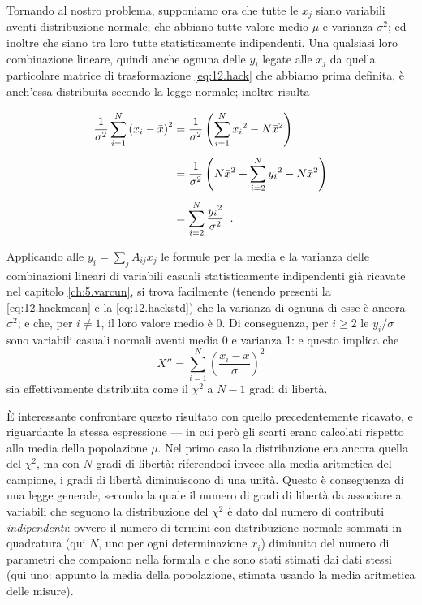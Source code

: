 Tornando al nostro problema, supponiamo ora che tutte le
$x_j$ siano variabili aventi distribuzione normale; che
abbiano tutte valore medio $\mu$ e varianza $\sigma^2$; ed
inoltre che siano tra loro tutte statisticamente
indipendenti.  Una qualsiasi loro combinazione lineare,
quindi anche ognuna delle $y_i$ legate alle $x_j$ da quella
particolare matrice di trasformazione \eqref{eq:12.hack} che
abbiamo prima definita, \`e anch'essa distribuita secondo la
legge normale; inoltre risulta

\begin{align*}
  \frac{1}{\sigma^2} \sum_{i=1}^N \left( x_i - \bar x
    \right)^2 &= \frac{1}{\sigma^2} \left(
    \sum_{i=1}^N {x_i}^2 - N {\bar x}^2 \right) \\[1ex]
  &= \frac{1}{\sigma^2} \left( N {\bar x}^2 +
    \sum_{i=2}^N {y_i}^2 - N {\bar x}^2  \right)
    \\[1ex]
  &= \sum_{i=2}^N \frac{{y_i}^2}{\sigma^2} \;\; .
\end{align*}

Applicando alle $y_i = \sum_j A_{ij} x_j$ le formule per la
media e la varianza delle combinazioni lineari di variabili
casuali statisticamente indipendenti gi\`a ricavate nel
capitolo \ref{ch:5.varcun}, si trova facilmente (tenendo
presenti la \eqref{eq:12.hackmean} e la
\eqref{eq:12.hackstd}) che la varianza di ognuna di esse \`e
ancora $\sigma^2$; e che, per $i \ne 1$, il loro valore
medio \`e 0.  Di conseguenza, per $i \geq 2$ le $y_i /
\sigma$ sono variabili casuali normali aventi media 0 e
varianza 1: e questo implica che
\begin{equation} \label{eq:12.xii}
  X'' = \sum_{i=1}^N \left( \frac{x_i - \bar x}{\sigma}
    \right)^2
\end{equation}
sia effettivamente distribuita come il $\chi^2$ a
$N - 1$ gradi di libert\`a.

\`E interessante confrontare questo risultato con quello
precedentemente ricavato, e riguardante la stessa
espressione --- in cui per\`o gli scarti erano calcolati
rispetto alla media della popolazione $\mu$.  Nel primo caso
la distribuzione era ancora quella del $\chi^2$, ma con $N$
gradi di libert\`a: riferendoci invece alla media aritmetica
del campione, i gradi di libert\`a diminuiscono di una
unit\`a.  Questo \`e conseguenza di una legge generale,
secondo la quale il numero di gradi di libert\`a da
associare a variabili che seguono la distribuzione del
$\chi^2$ \`e dato dal numero di contributi
\emph{indipendenti}: ovvero il numero di termini con
distribuzione normale sommati in quadratura (qui $N$, uno
per ogni determinazione $x_i$) diminuito del numero di
parametri che compaiono nella formula e che sono stati
stimati dai dati stessi (qui uno: appunto la media della
popolazione, stimata usando la media aritmetica delle
misure).

